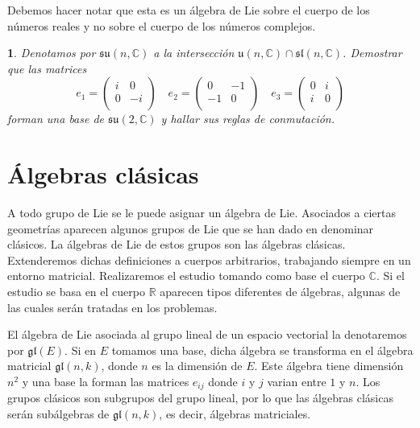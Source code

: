 \documentclass[a4paper,draft,12pt]{scrartcl}
\newtheorem{pro1}{}%
\newenvironment{pro}{\begin{pro1} \rm} {\end{pro1}}
\newcommand{\R}{\mathbb{R}}%
\newcommand{\C}{\mathbb{C}}%
\newcommand{\df}[1]{\textsf{\color{blue}#1}}
\begin{document}
Debemos hacer notar que esta es un álgebra de Lie sobre el cuerpo de los números reales y no sobre el cuerpo de los números complejos.



\begin{pro}

Denotamos por $\mathfrak{su}(n,\C)$ a la intersección  $\mathfrak{u}(n,\C) \cap \mathfrak{sl}(n,\C)$.
Demostrar que las matrices
$$
e_1= \begin{pmatrix}
i & 0\\
0 & -i \\
\end{pmatrix}
\quad
e_2= \begin{pmatrix}
0 & -1\\
-1 & 0 \\
\end{pmatrix}
\quad
e_3= \begin{pmatrix}
0 & i\\
i & 0 \\
\end{pmatrix}
$$
forman una base de $\mathfrak{su}(2,\C)$ y hallar sus reglas de conmutación.

\end{pro}

\newpage

\section{Álgebras clásicas}

A todo grupo de Lie se le puede asignar un álgebra de Lie.   Asociados a ciertas geometrías aparecen algunos grupos de Lie que se han dado en denominar clásicos.  La álgebras de Lie de estos grupos son las  \df{álgebras clásicas}. Extenderemos dichas definiciones a cuerpos arbitrarios, trabajando siempre en un entorno matricial.  Realizaremos el estudio tomando como base el cuerpo $\C$.  Si el estudio se basa en el cuerpo $\R$ aparecen tipos diferentes de álgebras, algunas de las cuales serán tratadas en los problemas.

\bigskip

El álgebra de Lie asociada al grupo lineal de un espacio vectorial la denotaremos por $\mathfrak{gl}(E)$.  Si en $E$ tomamos una base, dicha álgebra se transforma en el álgebra matricial $\mathfrak{gl}(n,k)$, donde $n$ es la dimensión de $E$.  Este álgebra tiene dimensión $n^2$ y una base la forman las matrices $e_{ij}$ donde $i$ y $j$ varian entre $1$ y $n$.  Los grupos clásicos son subgrupos del grupo lineal, por lo que las álgebras clásicas serán subálgebras de $\mathfrak{gl}(n,k)$, es decir, álgebras matriciales.
\end{document}
